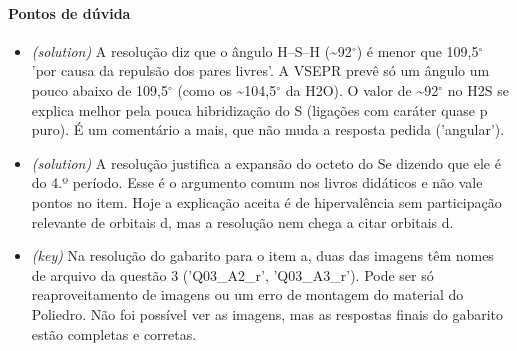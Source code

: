 \documentclass{article}%
\begin{document}
\paragraph{Pontos de dúvida}%
\begin{itemize}%
\item%
\textit{(solution)} A resolução diz que o ângulo H--S--H (\textasciitilde{}92$^\circ$) é menor que 109,5$^\circ$ 'por causa da repulsão dos pares livres'. A VSEPR prevê só um ângulo um pouco abaixo de 109,5$^\circ$ (como os \textasciitilde{}104,5$^\circ$ da H2O). O valor de \textasciitilde{}92$^\circ$ no H2S se explica melhor pela pouca hibridização do S (ligações com caráter quase p puro). É um comentário a mais, que não muda a resposta pedida ('angular').%
\item%
\textit{(solution)} A resolução justifica a expansão do octeto do Se dizendo que ele é do 4.º período. Esse é o argumento comum nos livros didáticos e não vale pontos no item. Hoje a explicação aceita é de hipervalência sem participação relevante de orbitais d, mas a resolução nem chega a citar orbitais d.%
\item%
\textit{(key)} Na resolução do gabarito para o item a, duas das imagens têm nomes de arquivo da questão 3 ('Q03\_A2\_r', 'Q03\_A3\_r'). Pode ser só reaproveitamento de imagens ou um erro de montagem do material do Poliedro. Não foi possível ver as imagens, mas as respostas finais do gabarito estão completas e corretas.%
\end{itemize}%
\end{document}
